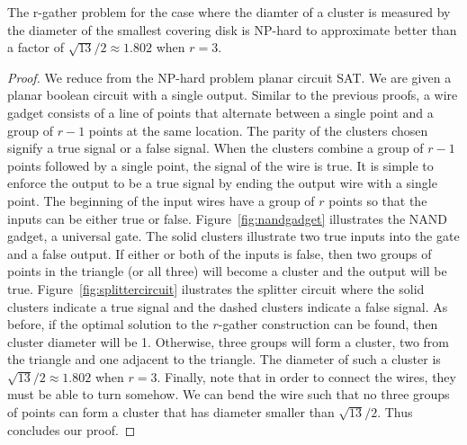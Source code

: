 \documentclass[11pt]{article}
\begin{document}
\begin{theorem}
The r-gather problem for the case where the diamter of a cluster is measured by the diameter of the smallest covering disk is NP-hard to approximate better than a factor of $\sqrt{13}/2 \approx 1.802$ when $r=3$.
\end{theorem}
\begin{proof}
We reduce from the NP-hard problem planar circuit SAT.  We are given a planar boolean circuit with a single output.  Similar to the previous proofs, a wire gadget consists of a line of points that alternate between a single point and a group of $r-1$ points at the same location.  The parity of the clusters chosen signify a true signal or a false signal.  When the clusters combine a group of $r-1$ points followed by a single point, the signal of the wire is true.  It is simple to enforce the output to be a true signal by ending the output wire with a single point.  The beginning of the input wires have a group of $r$ points so that the inputs can be either true or false.  Figure~\ref{fig:nandgadget} illustrates the NAND gadget, a universal gate.  The solid clusters illustrate two true inputs into the gate and a false output.  If either or both of the inputs is false, then two groups of points in the triangle (or all three) will become a cluster and the output will be true.  Figure~\ref{fig:splittercircuit} ilustrates the splitter circuit where the solid clusters indicate a true signal and the dashed clusters indicate a false signal.  As before, if the optimal solution to the $r$-gather construction can be found, then cluster diameter will be 1.  Otherwise, three groups will form a cluster, two from the triangle and one adjacent to the triangle.  The diameter of such a cluster is $\sqrt{13}/2 \approx 1.802$ when $r=3$.  Finally, note that in order to connect the wires, they must be able to turn somehow.   We can bend the wire such that no three groups of points can form a cluster that has diameter smaller than $\sqrt{13}/2$.  Thus concludes our proof.
\end{proof}
\end{document}
